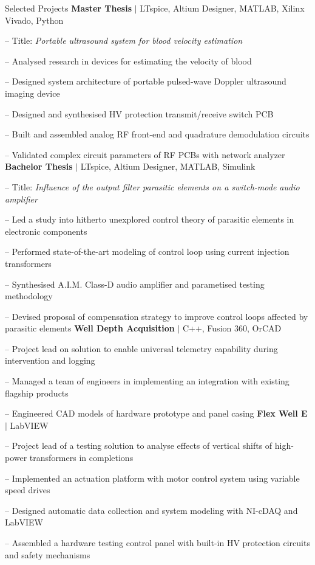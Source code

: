 
\begin{rubric}{\faTasks[solid]  Selected Projects}
\entry*[2023][]%
	\textbf{Master Thesis} $|$ LTspice, Altium Designer, MATLAB, Xilinx Vivado, Python \par
	-- Title: \emph{Portable ultrasound system for blood velocity estimation} \par
	-- Analysed research in devices for estimating the velocity of blood \par
	-- Designed system architecture of portable pulsed-wave Doppler ultrasound imaging device \par
	-- Designed and synthesised HV protection transmit/receive switch PCB \par
	-- Built and assembled analog RF front-end and quadrature demodulation circuits \par
	-- Validated complex circuit parameters of RF PCBs with network analyzer
%
\entry*[2020][] \textbf{Bachelor Thesis} $|$ LTspice, Altium Designer, MATLAB, Simulink \par
	-- Title: \emph{Influence of the output filter parasitic elements on a switch-mode audio amplifier} \par
	-- Led a study into hitherto unexplored control theory of parasitic elements in electronic components \par
	-- Performed state-of-the-art modeling of control loop using current injection transformers \par
	-- Synthesised A.I.M. Class-D audio amplifier and parametised testing methodology \par
	-- Devised proposal of compensation strategy to improve control loops affected by parasitic elements
%
\entry*[2017][] \textbf{Well Depth Acquisition} $|$ C++, Fusion 360, OrCAD \par
	-- Project lead on solution to enable universal telemetry capability during intervention and logging \par
	-- Managed a team of engineers in implementing an integration with existing flagship products \par
	-- Engineered CAD models of hardware prototype and panel casing %
%
\entry*[2016][] \textbf{Flex Well E} $|$ LabVIEW \par
	-- Project lead of a testing solution to analyse effects of vertical shifts of high-power transformers in completions \par
	-- Implemented an actuation platform with motor control system using variable speed drives \par
	-- Designed automatic data collection and system modeling with NI-cDAQ and LabVIEW \par
	-- Assembled a hardware testing control panel with built-in HV protection circuits and safety mechanisms
\end{rubric}